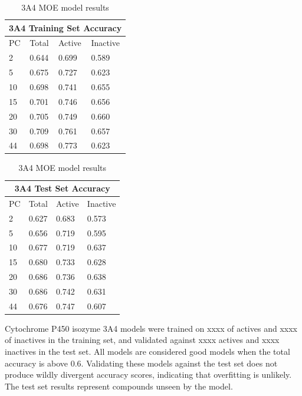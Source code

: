 \begin{table}[!h]
\begin{minipage}{.5\linewidth}
\centering
\begin{tabular}{|l|l|l|l|}
\hline
\multicolumn{4}{|c|}{3A4 Training Set Accuracy} \\ \hline
PC & Total          & Active          & Inactive \\ \hline
2  & 0.644          & 0.699           & 0.589   \\ \hline
5  & 0.675          & 0.727           & 0.623   \\ \hline
10 & 0.698          & 0.741           & 0.655   \\ \hline
15 & 0.701          & 0.746           & 0.656   \\ \hline
20 & 0.705          & 0.749           & 0.660   \\ \hline
30 & 0.709          & 0.761           & 0.657   \\ \hline
44 & 0.698          & 0.773           & 0.623   \\ \hline
\end{tabular}
\end{minipage}
\begin{minipage}{.5\linewidth}
\centering
\begin{tabular}{|l|l|l|l|}
\hline
\multicolumn{4}{|c|}{3A4 Test Set Accuracy}      \\ \hline
PC & Total          & Active          & Inactive \\ \hline
2  & 0.627          & 0.683           & 0.573    \\ \hline
5  & 0.656          & 0.719           & 0.595    \\ \hline
10 & 0.677          & 0.719           & 0.637    \\ \hline
15 & 0.680          & 0.733           & 0.628    \\ \hline
20 & 0.686          & 0.736           & 0.638    \\ \hline
30 & 0.686          & 0.742           & 0.631    \\ \hline
44 & 0.676          & 0.747           & 0.607    \\ \hline
\end{tabular}
\end{minipage}
\caption{3A4 MOE model results}
\end{table}

Cytochrome P450 isozyme 3A4 models were trained on xxxx of actives and xxxx of inactives in the training set, and validated against xxxx actives and xxxx inactives in the test set. All models are considered good models when the  total accuracy is above 0.6. Validating these models against the test set does not produce wildly divergent accuracy scores, indicating that overfitting is unlikely. The test set results represent compounds unseen by the model. 

